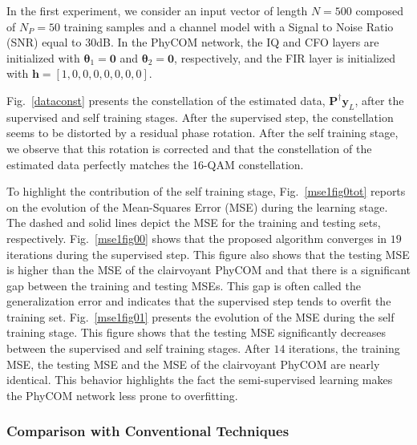 \documentclass{article}
\begin{document}
In the first experiment, we consider an input vector of length $N=500$ composed of $N_P=50$ training samples and a channel model with a Signal to Noise Ratio (SNR) equal to $30$dB. In the PhyCOM network, the IQ and CFO layers are initialized with $\boldsymbol\theta_1=\mathbf{0}$ and $\boldsymbol\theta_2=\mathbf{0}$, respectively, and the FIR layer is initialized with $\mathbf{h}=[1,0,0,0,0,0,0,0]$.


Fig.~\ref{dataconst} presents the constellation of the estimated data, $\mathbf{P}^{\dagger}\mathbf{y}_{L}$, after the supervised and self training stages. After the supervised step, the constellation seems to be distorted by a residual phase rotation. After the self training stage, we observe that this rotation is corrected and that the constellation of the estimated data perfectly matches the 16-QAM constellation.

To highlight the contribution of the self training stage, Fig.~\ref{mse1fig0tot} reports on the evolution of the Mean-Squares Error (MSE) during the learning stage. The dashed and solid lines depict the MSE for the training and testing sets, respectively. Fig.~\ref{mse1fig00} shows that the proposed algorithm converges in $19$ iterations during the supervised step. This figure also shows that the testing MSE is higher than the MSE of the clairvoyant PhyCOM and that there is a significant gap between the training and testing MSEs. This gap is often called the generalization error and indicates that the supervised step tends to overfit the training set. Fig.~\ref{mse1fig01} presents the evolution of the MSE during the self training stage. This figure shows that the testing MSE significantly decreases between the supervised and self training stages. After $14$ iterations, the training MSE, the testing MSE and the MSE of the clairvoyant PhyCOM are nearly identical. This behavior highlights the fact the semi-supervised learning makes the PhyCOM network less prone to overfitting.


\subsubsection{Comparison with Conventional Techniques}
\end{document}
